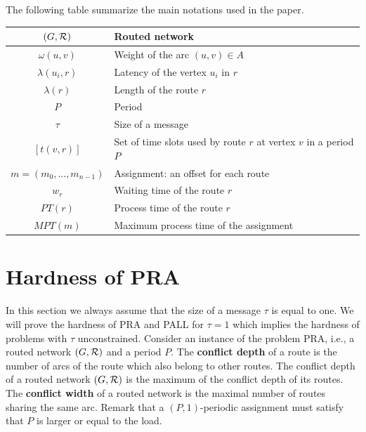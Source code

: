 \documentclass[10pt, conference, letterpaper]{IEEEtran}
\begin{document}
     
      The following table summarize the main notations used in the paper.
      \begin{center}
   \begin{tabularx}{0.5\textwidth}{|c|X|}
    \hline
     $(G,\cal R)$ & Routed network \\
     \hline
      $\omega(u,v)$ & Weight of the arc $(u,v) \in A$ \\
      \hline
      $\lambda(u_i,r)$ & Latency of the vertex $u_i$ in $r$\\
         \hline
         $\lambda(r)$ & Length of the route $r$\\
         \hline
         $P$ & Period\\
         \hline
         $\tau$ & Size of a message\\
         \hline
         $ [t(v,r)]$& Set of time slots used by route $r$ at vertex $v$ in a period $P$\\
         \hline 
         $m=(m_0, \ldots ,m_{n-1})$& Assignment: an offset for each route\\
              \hline 
         $w_r$& Waiting time of the route $r$\\
            \hline 
         $PT(r)$& Process time of the route $r$\\
           \hline 
         $MPT(m)$& Maximum process time of the assignment\\
    \hline

      \end{tabularx}
      \end{center}


\section{Hardness of PRA}
  \label{sec:complexity}

 In this section we always assume that the size of a message $\tau$ is equal to one. 
 We will prove the hardness of PRA and PALL for $\tau =1$ which implies the hardness of problems with $\tau$ unconstrained. 
Consider an instance of the problem PRA, i.e., a routed network $(G,\cal{R})$ and a period $P$.
The {\bf conflict depth} of a route is the number of arcs of the route which also belong to other routes.
The conflict depth of a routed network $(G,\cal{R})$ is the maximum of the conflict depth of its routes.
The {\bf conflict width} of a routed network is the maximal number of routes sharing the same arc.
Remark that a $(P,1)$-periodic assignment must satisfy that $P$ is larger or equal to the load.
\end{document}
